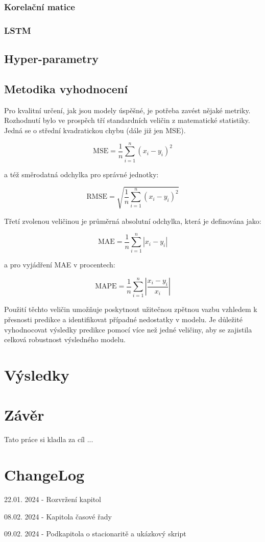 \documentclass[FM,BP,fonts]{tulthesis}
\begin{document}
\subsection{Korelační matice}
\subsection{LSTM}
\section{Hyper-parametry}


\newpage

\section{Metodika vyhodnocení}\label{section:error-matrix}
Pro kvalitní určení, jak jsou modely úspěšné, je potřeba zavést nějaké metriky. Rozhodnutí bylo ve prospěch tří standardních veličin z matematické statistiky. Jedná se o střední kvadratickou chybu (dále již jen MSE). 

\begin{equation}
	\text{MSE} = \frac{1}{n}\sum_{i=1}^{n}(x_i-y_i)^2 
\end{equation}

a též směrodatná odchylka pro správné jednotky:

\begin{equation}
	\text{RMSE} = \sqrt{\frac{1}{n}\sum_{i=1}^{n}(x_i-y_i)^2}
\end{equation}

Třetí zvolenou veličinou je průměrná absolutní odchylka, která je definována jako:

\begin{equation}
	\text{MAE} = \frac{1}{n}\sum_{i=1}^{n}|x_i-y_i| 
\end{equation}

a pro vyjádření MAE v procentech: 

\begin{equation}
	\text{MAPE} = \frac{1}{n}\sum_{i=1}^{n}|\frac{x_i-y_i}{x_i}| 
\end{equation}

Použití těchto veličin umožňuje poskytnout užitečnou zpětnou vazbu vzhledem k přesnosti predikce a identifikovat případné nedostatky v modelu. Je důležité vyhodnocovat výsledky predikce pomocí více než jedné veličiny, aby se zajistila celková robustnost výsledného modelu.


\chapter{Výsledky}\label{Výsledky}

\chapter{Závěr}
Tato práce si kladla za cíl ... 

\chapter{ChangeLog}
22.01. 2024 - Rozvržení kapitol

08.02. 2024 - Kapitola časové řady

09.02. 2024 - Podkapitola o stacionaritě a ukázkový skript
\end{document}
